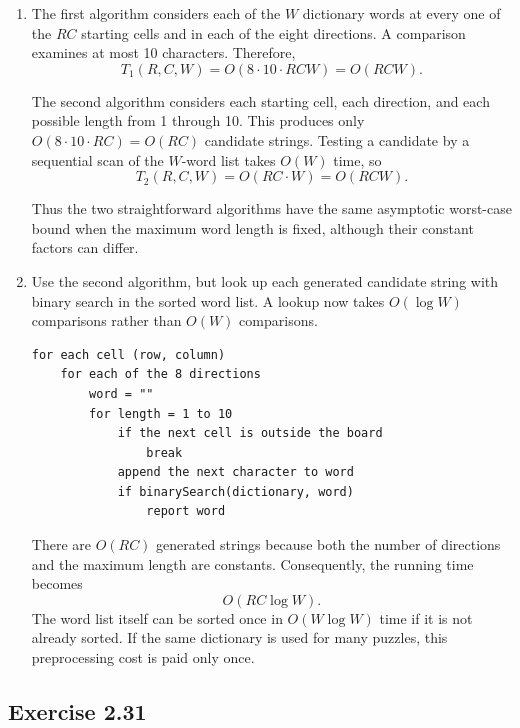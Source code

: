 \documentclass[12pt,a4paper]{article}
\begin{document}
\begin{enumerate}
  \renewcommand{\labelenumi}{\alph{enumi}.}

  \item The first algorithm considers each of the $W$ dictionary words
  at every one of the $RC$ starting cells and in each of the eight
  directions. A comparison examines at most 10 characters. Therefore,
  \[
  T_1(R,C,W)=O(8\cdot10\cdot RCW)
            =\boxed{O(RCW)}.
  \]

  The second algorithm considers each starting cell, each direction,
  and each possible length from 1 through 10. This produces only
  $O(8\cdot10\cdot RC)=O(RC)$ candidate strings. Testing a candidate by
  a sequential scan of the $W$-word list takes $O(W)$ time, so
  \[
  T_2(R,C,W)=O(RC\cdot W)=\boxed{O(RCW)}.
  \]

  Thus the two straightforward algorithms have the same asymptotic
  worst-case bound when the maximum word length is fixed, although their
  constant factors can differ.

  \item Use the second algorithm, but look up each generated candidate
  string with binary search in the sorted word list. A lookup now takes
  $O(\log W)$ comparisons rather than $O(W)$ comparisons.

\begin{lstlisting}
for each cell (row, column)
    for each of the 8 directions
        word = ""
        for length = 1 to 10
            if the next cell is outside the board
                break
            append the next character to word
            if binarySearch(dictionary, word)
                report word
\end{lstlisting}

  There are $O(RC)$ generated strings because both the number of
  directions and the maximum length are constants. Consequently, the
  running time becomes
  \[
  \boxed{O(RC\log W)}.
  \]
  The word list itself can be sorted once in $O(W\log W)$ time if it is
  not already sorted. If the same dictionary is used for many puzzles,
  this preprocessing cost is paid only once.
\end{enumerate}

\subsection*{\color{sectionnavy}Exercise 2.31}
\end{document}
